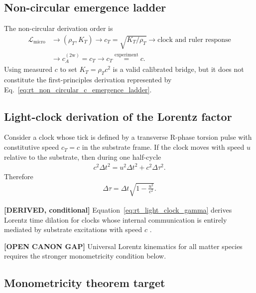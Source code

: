 \subsection{Non-circular emergence ladder}

The non-circular derivation order is
\begin{align}
    \mathcal L_{\mathrm{micro}}
    &\longrightarrow
    \left(\rho_T,K_T\right)
    \longrightarrow
    c_T=\sqrt{K_T/\rho_T}
    \longrightarrow
    \text{clock and ruler response}
    \nonumber\\
    &\longrightarrow
    c_A^{(2\mathrm w)}=c_T
    \longrightarrow
    c_T\stackrel{\mathrm{experiment}}{=}c .
    \label{eq:rt_non_circular_c_emergence_ladder}
\end{align}
Using measured \(c\) to set \(K_T=\rho_Tc^2\) is a valid calibrated bridge, but
it does not constitute the first-principles derivation represented by
Eq.~\eqref{eq:rt_non_circular_c_emergence_ladder}.

\subsection{Light-clock derivation of the Lorentz factor}

Consider a clock whose tick is defined by a transverse R-phase torsion pulse
with constitutive speed \(c_T=c\) in the substrate frame. If the clock moves with
speed \(u\) relative to the substrate, then during one half-cycle
\begin{align}
    c^2 \Delta t^2
    =
    u^2 \Delta t^2 + c^2 \Delta \tau^2 .
\end{align}
Therefore
\begin{align}
    \Delta \tau
    =
    \Delta t
    \sqrt{1-\frac{u^2}{c^2}} .
    \label{eq:rt_light_clock_gamma}
\end{align}

\textbf{[DERIVED, conditional]} Equation~\eqref{eq:rt_light_clock_gamma}
derives Lorentz time dilation for clocks whose internal communication is
entirely mediated by substrate excitations with speed \(c\) \cite{Einstein1905}.

\textbf{[OPEN CANON GAP]} Universal Lorentz kinematics for all matter species
requires the stronger monometricity condition below.

\subsection{Monometricity theorem target}

